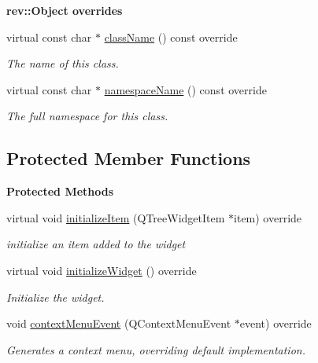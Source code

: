 \begin{Indent}\textbf{ rev\+::Object overrides}\par
\begin{DoxyCompactItemize}
\item 
virtual const char $\ast$ \mbox{\hyperlink{classrev_1_1_view_1_1_mesh_tree_widget_a1fe0980bbddcafe4801991a0a70a8a3d}{class\+Name}} () const override
\begin{DoxyCompactList}\small\item\em The name of this class. \end{DoxyCompactList}\item 
virtual const char $\ast$ \mbox{\hyperlink{classrev_1_1_view_1_1_mesh_tree_widget_a9051050a76f3eb339fe8eacfac5806ca}{namespace\+Name}} () const override
\begin{DoxyCompactList}\small\item\em The full namespace for this class. \end{DoxyCompactList}\end{DoxyCompactItemize}
\end{Indent}
\subsection*{Protected Member Functions}
\begin{Indent}\textbf{ Protected Methods}\par
\begin{DoxyCompactItemize}
\item 
\mbox{\label{classrev_1_1_view_1_1_mesh_tree_widget_aac225458869e32ecd6e8db4d5bbc34ed}} 
virtual void \mbox{\hyperlink{classrev_1_1_view_1_1_mesh_tree_widget_aac225458869e32ecd6e8db4d5bbc34ed}{initialize\+Item}} (Q\+Tree\+Widget\+Item $\ast$item) override
\begin{DoxyCompactList}\small\item\em initialize an item added to the widget \end{DoxyCompactList}\item 
\mbox{\label{classrev_1_1_view_1_1_mesh_tree_widget_a1ef1fe48e20361d0f51ed5ec4dc28c54}} 
virtual void \mbox{\hyperlink{classrev_1_1_view_1_1_mesh_tree_widget_a1ef1fe48e20361d0f51ed5ec4dc28c54}{initialize\+Widget}} () override
\begin{DoxyCompactList}\small\item\em Initialize the widget. \end{DoxyCompactList}\item 
void \mbox{\hyperlink{classrev_1_1_view_1_1_mesh_tree_widget_aede9f57981eaf35d876cd10dccd545fa}{context\+Menu\+Event}} (Q\+Context\+Menu\+Event $\ast$event) override
\begin{DoxyCompactList}\small\item\em Generates a context menu, overriding default implementation. \end{DoxyCompactList}\end{DoxyCompactItemize}
\end{Indent}
